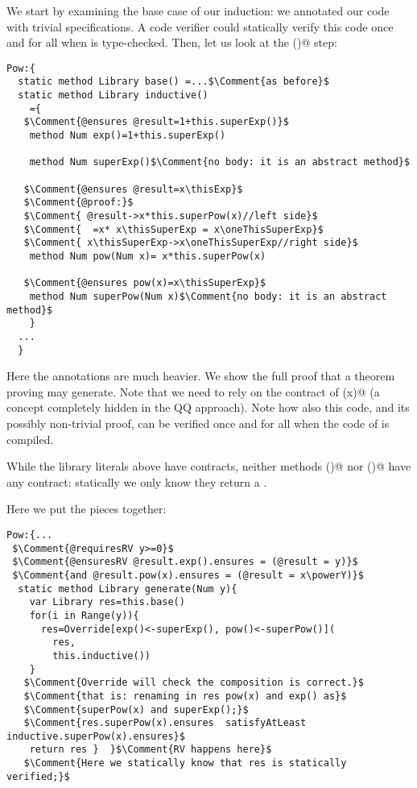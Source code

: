 \noindent
We start by examining the base case of our induction: we annotated our 
code with trivial specifications.
A code verifier could statically verify this code 
once and for all when \Q@Pow@ is type-checked.
Then, let us look at the \Q@inductive()@ step:

\begin{lstlisting}
Pow:{
  static method Library base() =...$\Comment{as before}$
  static method Library inductive() 
    ={
   $\Comment{@ensures @result=1+this.superExp()}$
    method Num exp()=1+this.superExp() 
      
    method Num superExp()$\Comment{no body: it is an abstract method}$
      
   $\Comment{@ensures @result=x\thisExp}$
   $\Comment{@proof:}$
   $\Comment{ @result->x*this.superPow(x)//left side}$
   $\Comment{  =x* x\thisSuperExp = x\oneThisSuperExp}$
   $\Comment{ x\thisSuperExp->x\oneThisSuperExp//right side}$
    method Num pow(Num x)= x*this.superPow(x)
      
   $\Comment{@ensures pow(x)=x\thisSuperExp}$
    method Num superPow(Num x)$\Comment{no body: it is an abstract method}$
    }
  ...
  }
\end{lstlisting}

Here the annotations are much heavier.
We show the full proof that a theorem proving may generate.
Note that we need to rely on the contract of \Q@superPow(x)@ (a concept completely hidden in the QQ approach).
Note how also this code, and its possibly non-trivial proof, can be verified once and for all when the code of \Q@Pow@ is compiled.

While the library literals above have contracts,
neither methods \Q@base()@ nor \Q@inductive()@ have any contract:
statically we only know they return a \Q@Library@.

\noindent
Here we put the pieces together:

\begin{lstlisting}
Pow:{...
 $\Comment{@requiresRV y>=0}$
 $\Comment{@ensuresRV @result.exp().ensures = (@result = y)}$
 $\Comment{and @result.pow(x).ensures = (@result = x\powerY)}$
  static method Library generate(Num y){
    var Library res=this.base()
    for(i in Range(y)){
      res=Override[exp()<-superExp(), pow()<-superPow()](
        res,
        this.inductive())
    }
   $\Comment{Override will check the composition is correct.}$
   $\Comment{that is: renaming in res pow(x) and exp() as}$
   $\Comment{superPow(x) and superExp();}$
   $\Comment{res.superPow(x).ensures  satisfyAtLeast inductive.superPow(x).ensures}$
    return res }  }$\Comment{RV happens here}$
   $\Comment{Here we statically know that res is statically verified;}$
\end{lstlisting}

